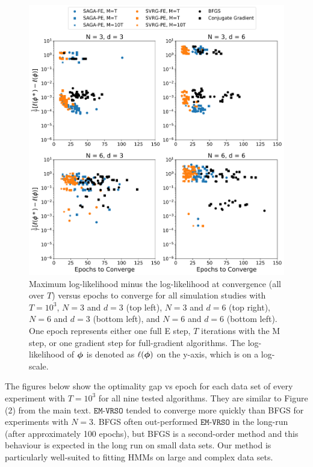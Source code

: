 \documentclass[12pt]{article}
\begin{document}
\begin{figure}[H]
    \centering
    \includegraphics[width=6.5in]{../plt/scatter_sim_T_1000.png}
    \caption{Maximum log-likelihood minus the log-likelihood at convergence (all over $T$) versus epochs to converge for all simulation studies with $T=10^{3}$, $N=3$ and $d=3$ (top left), $N=3$ and $d=6$ (top right), $N=6$ and $d=3$ (bottom left), and $N=6$ and $d=6$ (bottom left). One epoch represents either one full E step, $T$ iterations with the M step, or one gradient step for full-gradient algorithms. The log-likelihood of $\boldsymbol{\phi}$ is denoted as $\ell(\boldsymbol{\phi})$ on the y-axis, which is on a log-scale.}
    \label{fig:scatter_sim}
\end{figure}


\newpage 

The figures below show the optimality gap vs epoch for each data set of every experiment with $T=10^{3}$ for all nine tested algorithms. They are similar to Figure (2) from the main text. $\texttt{EM-VRSO}$ tended to converge more quickly than BFGS for experiments with $N=3$. BFGS often out-performed $\texttt{EM-VRSO}$ in the long-run (after approximately 100 epochs), but BFGS is a second-order method and this behaviour is expected in the long run on small data sets. Our method is particularly well-suited to fitting HMMs on large and complex data sets. 
\end{document}

